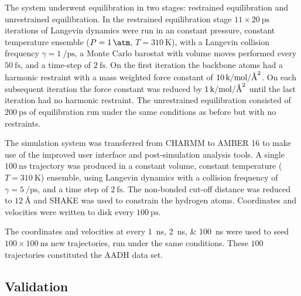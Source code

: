 The system underwent equilibration in two stages: restrained equilibration and unrestrained equilibration. In the restrained equilibration stage $11 \times \SI{20}{\pico\second}$ iterations of Langevin dynamics were run in an constant pressure, constant temperature ensemble ($P=\SI{1}{\atm}$, $T=\SI{310}{\kelvin}$), with a Langevin collision frequency $\gamma=\SI{1}{\per\pico\second}$, a Monte Carlo barostat with volume moves performed every  $\SI{50}{\femto\second}$, and a time-step of $\SI{2}{\femto\second}$. On the first iteration the backbone atoms had a harmonic restraint with a mass weighted force constant of  $\SI{10}{\kilo\cal\per\mol\per\square\angstrom}$. On each subsequent iteration the force constant was reduced by $\SI{1}{\kilo\cal\per\mol\per\square\angstrom}$ until the last iteration had no harmonic restraint. The unrestrained equilibration consisted of $\SI{200}{\pico\second}$ of equilibration run under the same conditions as before but with no restraints. 

The simulation system was transferred from CHARMM to AMBER 16 \cite{caseAMBER} to make use of the improved user interface and post-simulation analysis tools. A single  $\SI{100}{\nano\second}$ trajectory was produced in a constant volume, constant temperature ($T=\SI{310}{\kelvin}$) ensemble, using Langevin dynamics with a collision frequency of $\gamma=\SI{5}{\per\pico\second}$, and a time step of $\SI{2}{\femto\second}$. The non-bonded cut-off distance was reduced to $\SI{12}{\angstrom}$ and SHAKE was used to constrain the hydrogen atoms. Coordinates and velocities were written to disk every $\SI{100}{\pico\second}$.  

The coordinates and velocities at every \SIlist[list-final-separator = { ... }]{1; 2; 100}{\nano\second} were used to seed $100 \times \SI{100}{\nano\second}$ new trajectories, run under the same conditions. These $100$ trajectories constituted the AADH data set. 

\subsection{Validation}\label{sec:aadh_validation}


